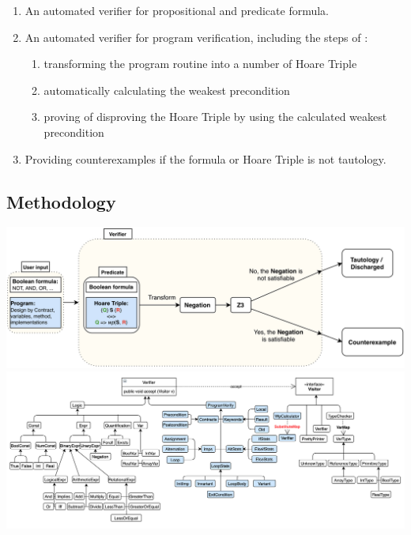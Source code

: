 \documentclass[a0,landscape]{a0poster}
\def\graphspacing{\vspace{.5cm}}
\newcommand{\capcolor}[1]{{\color{Black} #1}}
\begin{document}
\begin{multicols}{4}
{\begin{enumerate}
\item An automated verifier for propositional and predicate formula.
\item An automated verifier for program verification, including the steps of :
\begin{enumerate}
\item transforming the program routine into a number of Hoare Triple
\item automatically calculating the weakest precondition
\item proving of disproving the Hoare Triple by using the calculated weakest precondition
\end{enumerate}
\item Providing counterexamples if the formula or Hoare Triple is not tautology.
\end{enumerate}
}


{\color{Blue} \subsection*{Methodology}}

\begin{center}\graphspacing
\centering
\includegraphics[width=\linewidth]{figures/myTool-extension.jpg}
\includegraphics[width=\linewidth]{figures/Verifier_hiararchy}
\label{fig:framework}
\end{center}\graphspacing


\end{multicols}
\end{document}
